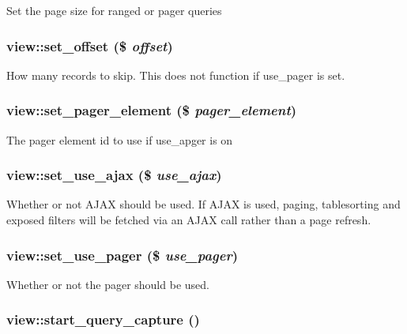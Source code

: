 Set the page size for ranged or pager queries \hypertarget{classview_e8156db948b1c7efaeeebd72148147f5}{
\subsubsection[{set\_\-offset}]{\setlength{\rightskip}{0pt plus 5cm}view::set\_\-offset (\$ {\em offset})}}
\label{classview_e8156db948b1c7efaeeebd72148147f5}


How many records to skip. This does not function if use\_\-pager is set. \hypertarget{classview_516bd36d65179ed026f565e229f3d676}{
\subsubsection[{set\_\-pager\_\-element}]{\setlength{\rightskip}{0pt plus 5cm}view::set\_\-pager\_\-element (\$ {\em pager\_\-element})}}
\label{classview_516bd36d65179ed026f565e229f3d676}


The pager element id to use if use\_\-apger is on \hypertarget{classview_77bfc90f75fc5bdbf34cb7f7678c4840}{
\subsubsection[{set\_\-use\_\-ajax}]{\setlength{\rightskip}{0pt plus 5cm}view::set\_\-use\_\-ajax (\$ {\em use\_\-ajax})}}
\label{classview_77bfc90f75fc5bdbf34cb7f7678c4840}


Whether or not AJAX should be used. If AJAX is used, paging, tablesorting and exposed filters will be fetched via an AJAX call rather than a page refresh. \hypertarget{classview_d20caae0391d958137ed7d7c2e4e3750}{
\subsubsection[{set\_\-use\_\-pager}]{\setlength{\rightskip}{0pt plus 5cm}view::set\_\-use\_\-pager (\$ {\em use\_\-pager})}}
\label{classview_d20caae0391d958137ed7d7c2e4e3750}


Whether or not the pager should be used. \hypertarget{classview_1e3efc171324e713e7e130c445dbf84d}{
\subsubsection[{start\_\-query\_\-capture}]{\setlength{\rightskip}{0pt plus 5cm}view::start\_\-query\_\-capture ()}}
\label{classview_1e3efc171324e713e7e130c445dbf84d}


